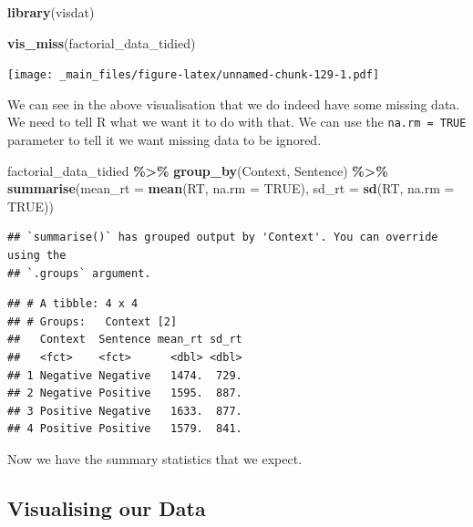 \documentclass[
]{book}
\newenvironment{Shaded}{\begin{snugshade}}{\end{snugshade}}
\newcommand{\AttributeTok}[1]{\textcolor[rgb]{0.13,0.29,0.53}{#1}}
\newcommand{\ConstantTok}[1]{\textcolor[rgb]{0.56,0.35,0.01}{#1}}
\newcommand{\FunctionTok}[1]{\textcolor[rgb]{0.13,0.29,0.53}{\textbf{#1}}}
\newcommand{\NormalTok}[1]{#1}
\newcommand{\SpecialCharTok}[1]{\textcolor[rgb]{0.81,0.36,0.00}{\textbf{#1}}}
\begin{document}
\begin{Shaded}
\begin{Highlighting}[]
\FunctionTok{library}\NormalTok{(visdat)}
\end{Highlighting}
\end{Shaded}

\begin{Shaded}
\begin{Highlighting}[]
\FunctionTok{vis\_miss}\NormalTok{(factorial\_data\_tidied)}
\end{Highlighting}
\end{Shaded}

\texttt{[image: \_main\_files/figure-latex/unnamed-chunk-129-1.pdf]}

We can see in the above visualisation that we do indeed have some missing data. We need to tell R what we want it to do with that. We can use the \texttt{na.rm\ =\ TRUE} parameter to tell it we want missing data to be ignored.

\begin{Shaded}
\begin{Highlighting}[]
\NormalTok{factorial\_data\_tidied }\SpecialCharTok{\%\textgreater{}\%}
  \FunctionTok{group\_by}\NormalTok{(Context, Sentence) }\SpecialCharTok{\%\textgreater{}\%}
  \FunctionTok{summarise}\NormalTok{(}\AttributeTok{mean\_rt =} \FunctionTok{mean}\NormalTok{(RT, }\AttributeTok{na.rm =} \ConstantTok{TRUE}\NormalTok{), }\AttributeTok{sd\_rt =} \FunctionTok{sd}\NormalTok{(RT, }\AttributeTok{na.rm =} \ConstantTok{TRUE}\NormalTok{))}
\end{Highlighting}
\end{Shaded}

\begin{verbatim}
## `summarise()` has grouped output by 'Context'. You can override using the
## `.groups` argument.
\end{verbatim}

\begin{verbatim}
## # A tibble: 4 x 4
## # Groups:   Context [2]
##   Context  Sentence mean_rt sd_rt
##   <fct>    <fct>      <dbl> <dbl>
## 1 Negative Negative   1474.  729.
## 2 Negative Positive   1595.  887.
## 3 Positive Negative   1633.  877.
## 4 Positive Positive   1579.  841.
\end{verbatim}

Now we have the summary statistics that we expect.

\hypertarget{visualising-our-data-2}{%
\subsection{Visualising our Data}\label{visualising-our-data-2}}
\end{document}
